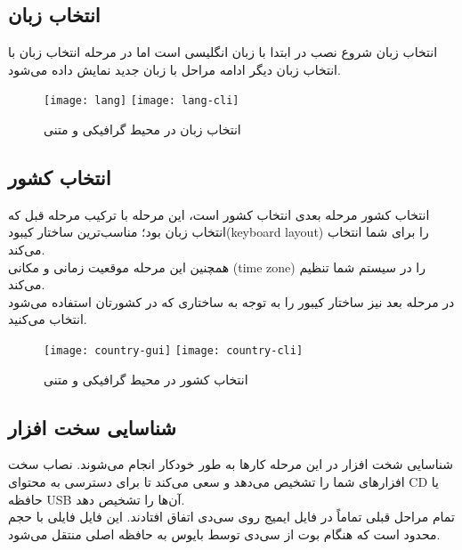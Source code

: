 \subsection{انتخاب زبان}
\begin{frame}{انتخاب زبان}
  شروع نصب در ابتدا با زبان انگلیسی است اما در مرحله انتخاب زبان با انتخاب زبان دیگر ادامه مراحل با زبان جدید نمایش داده می‌شود.\\
  \begin{figure}
    \texttt{[image: lang]}
    \texttt{[image: lang-cli]}
    \caption{انتخاب زبان در محیط گرافیکی و متنی~\cite{deb_lang_gui}}
  \end{figure}
\end{frame}

\subsection{انتخاب کشور}
\begin{frame}{انتخاب کشور}
  مرحله بعدی انتخاب کشور است، این مرحله با ترکیب مرحله قبل که انتخاب زبان بود؛ مناسب‌ترین ساختار کیبود(keyboard layout) را برای شما انتخاب می‌کند.\\
  همچنین این مرحله موقعیت زمانی و مکانی (time zone) را در سیستم شما تنظیم می‌کند.\\
  در مرحله بعد نیز ساختار کیبور را به توجه به ساختاری که در کشورتان استفاده می‌شود انتخاب می‌کنید.
  \begin{figure}
    \texttt{[image: country-gui]}
    \texttt{[image: country-cli]}
    \caption{انتخاب کشور در محیط گرافیکی و متنی~\cite{deb_country_gui}}
  \end{figure}
\end{frame}


\subsection{شناسایی سخت افزار}
\begin{frame}{شناسایی شخت افزار}
  در این مرحله کارها به طور خودکار انجام می‌شوند. نصاب سخت افزارهای شما را تشخیص می‌دهد و سعی می‌کند تا برای دسترسی به محتوای CD یا حافظه USB آن‌ها را تشخیص دهد.\\
تمام مراحل قبلی تماماً در فایل ایمیج روی سی‌دی اتفاق افتادند. این فایل فایلی با حجم محدود است که هنگام بوت از سی‌دی توسط بایوس به حافظه اصلی منتقل می‌شود.
\end{frame}

